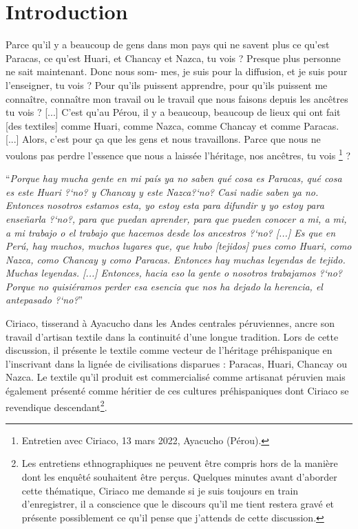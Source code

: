 \chapter*{Introduction}
\setlength{\columnsep}{3em}

 \begin{paracol}{2}
 \noindent  \og Parce qu'il y a beaucoup de gens dans mon pays qui ne savent plus ce qu'est Paracas, ce qu'est Huari, et Chancay et Nazca, tu vois ? Presque plus personne ne sait maintenant. Donc nous som- mes, je suis pour la diffusion, et je suis pour l'enseigner, tu vois ? Pour qu'ils puissent apprendre, pour qu'ils puissent me connaître, connaître mon travail ou le travail que nous faisons depuis les ancêtres tu vois ? [...] C'est qu'au Pérou, il y a beaucoup, beaucoup de lieux qui ont fait [des textiles] comme Huari, comme Nazca, comme Chancay et comme Paracas. [...] Alors, c'est pour ça que les gens et nous travaillons. Parce que nous ne voulons pas perdre l'essence que nous a laissée l'héritage, nos ancêtres, tu vois \footnote{Entretien avec Ciriaco, 13 mars 2022, Ayacucho (Pérou).} ? \fg \\
    
    \switchcolumn
    
    \textquotedblleft \textit{Porque hay mucha gente en mi país ya no saben qué cosa es Paracas, qué cosa es este Huari ?`no? y Chancay y este Nazca?`no? Casi nadie saben ya no. Entonces nosotros estamos esta, yo estoy esta para difundir y yo estoy para enseñarla ?`no?, para que puedan aprender, para que pueden conocer a mi, a mi, a mi trabajo o el trabajo que hacemos desde los ancestros ?`no? [...] Es que en Perú, hay muchos, muchos lugares que, que hubo [tejidos] pues como Huari, como Nazca, como Chancay y como Paracas. Entonces hay muchas leyendas de tejido. Muchas leyendas. [...] Entonces, hacia eso la gente o nosotros trabajamos ?`no? Porque no quisiéramos perder esa esencia que nos ha dejado la herencia, el antepasado ?`no?}\textquotedblright\\
\end{paracol}


Ciriaco, tisserand à Ayacucho dans les Andes centrales péruviennes, ancre son travail d'artisan textile dans la continuité d'une longue tradition. Lors de cette discussion, il présente le textile comme vecteur de l'héritage préhispanique en l'inscrivant dans la lignée de civilisations disparues : Paracas, Huari, Chancay ou Nazca. Le textile qu'il produit est commercialisé comme artisanat péruvien mais également présenté comme héritier de ces cultures préhispaniques dont Ciriaco se revendique descendant\footnote{Les entretiens ethnographiques ne peuvent être compris hors de la manière dont les enquêté souhaitent être perçus. Quelques minutes avant d'aborder cette thématique, Ciriaco me demande si je suis toujours en train d'enregistrer, il a conscience que le discours qu'il me tient restera gravé et présente possiblement ce qu'il pense que j'attends de cette discussion.}.
	
